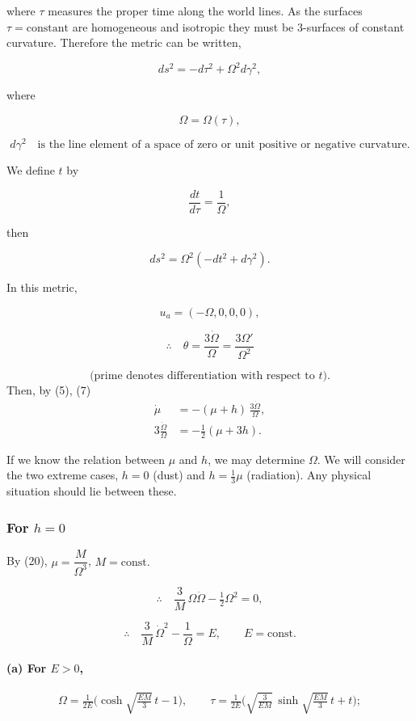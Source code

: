 where $\tau$ measures the proper time along the world lines. As the 
surfaces $\tau = \text{constant}$ are homogeneous and isotropic they must be 
3-surfaces of constant curvature. Therefore the metric can be 
written,

\[
ds^{2} = - d\tau^{2} + \Omega^{2} d\gamma^{2},
\]

where  

\[
\Omega = \Omega(\tau),
\]

\[
d\gamma^{2} \quad \text{is the line element of a space of zero or unit positive or negative curvature.}
\]

We define $t$ by  

\[
\frac{dt}{d\tau} = \frac{1}{\Omega},
\]

then  

\[
ds^{2} = \Omega^{2} \left( -dt^{2} + d\gamma^{2} \right).
\]

In this metric,  

\[
u_{a} = (-\Omega, 0, 0, 0),
\]

\[
\therefore \quad \theta = \frac{3 \dot{\Omega}}{\Omega} = \frac{3 \Omega'}{\Omega^{2}}
\]

\[
\text{(prime denotes differentiation with respect to $t$).}
\]
Then, by (5), (7)
\begin{align}
\dot{\mu} &= -(\mu + h)\,\frac{3\dot{\Omega}}{\Omega}, \tag{20}\\[6pt]
3\frac{\ddot{\Omega}}{\Omega} &= -\tfrac{1}{2}(\mu + 3h). \tag{21}
\end{align}

If we know the relation between $\mu$ and $h$, we may determine $\Omega$.  
We will consider the two extreme cases, $h=0$ (dust) and $h=\tfrac{1}{3}\mu$ (radiation).  
Any physical situation should lie between these.

\subsubsection*{For $h = 0$}

By (20), \quad $\mu = \dfrac{M}{\Omega^{3}}$, \quad $M = \text{const}.$

\[
\therefore \quad \frac{3}{M}\,\Omega \ddot{\Omega} - \tfrac{1}{2}\Omega^{2} = 0,
\]

\[
\therefore \quad \frac{3}{M}\,\dot{\Omega}^{2} - \frac{1}{\Omega} = E, 
\qquad E = \text{const}.
\]

\paragraph{(a) For $E>0$,}
\[
\Omega = \tfrac{1}{2E}\Big(\cosh \sqrt{\tfrac{E M}{3}}\,t - 1\Big), 
\qquad 
\tau = \tfrac{1}{2E}\Big(\sqrt{\tfrac{3}{E M}}\,\sinh \sqrt{\tfrac{E M}{3}}\,t + t \Big);
\]

